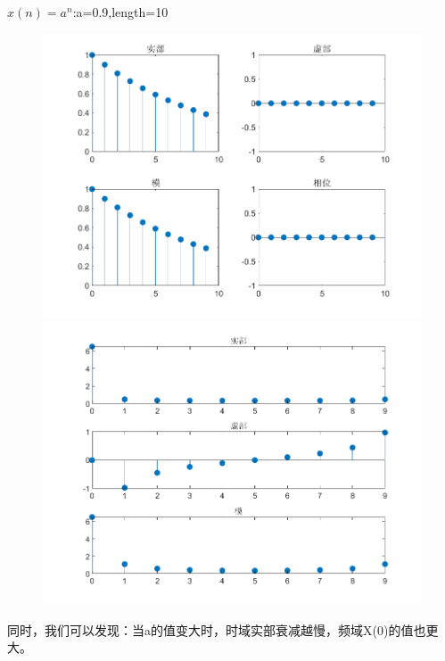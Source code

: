 \documentclass{beamer}
\begin{document}
\begin{frame}{$x(n) = a^n$:a=0.9,length=10}
    \begin{figure}[H]
        \centering
        \begin{minipage}[t]{0.48\textwidth}
        \centering
        \includegraphics[width=\textwidth]{figure/实指数序列_a=09,length=10.png}
        \end{minipage}
        \begin{minipage}[t]{0.48\textwidth}
        \centering
        \includegraphics[width=\textwidth]{figure/频谱_实指数序列_a=09,length=10.png}
        \end{minipage}
    \end{figure}
    \begin{block}{}
        同时，我们可以发现：当a的值变大时，时域实部衰减越慢，频域X(0)的值也更大。
    \end{block}
\end{frame}
\end{document}
